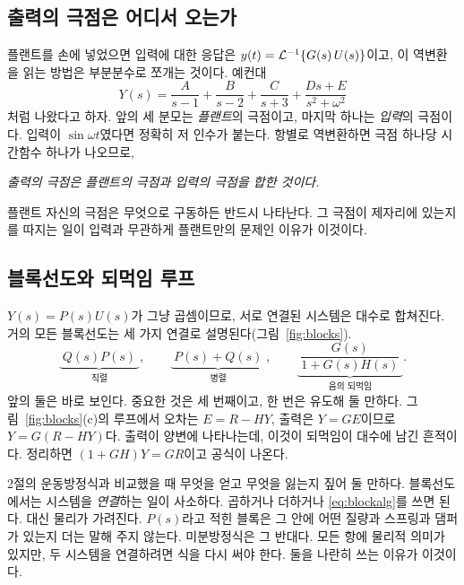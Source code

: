 \documentclass[11pt]{article}
\begin{document}
\subsection{출력의 극점은 어디서 오는가}\label{sec:outputpoles}
플랜트를 손에 넣었으면 입력에 대한 응답은 $y(t) = \mathcal{L}^{-1}\{G(s)\,U(s)\}$이고,
이 역변환을 읽는 방법은 부분분수로 쪼개는 것이다. 예컨대
\begin{equation}\label{eq:pfe}
   Y(s) = \frac{A}{s-1} + \frac{B}{s-2} + \frac{C}{s+3}
        + \frac{Ds+E}{s^{2}+\omega^{2}}
\end{equation}
처럼 나왔다고 하자. 앞의 세 분모는 \emph{플랜트}의 극점이고, 마지막 하나는
\emph{입력}의 극점이다. 입력이 $\sin\omega t$였다면 정확히 저 인수가 붙는다. 항별로
역변환하면 극점 하나당 시간함수 하나가 나오므로,
\begin{center}
\emph{출력의 극점은 플랜트의 극점과 입력의 극점을 합한 것이다.}
\end{center}
플랜트 자신의 극점은 무엇으로 구동하든 반드시 나타난다. 그 극점이 제자리에
있는지를 따지는 일이 입력과 무관하게 플랜트만의 문제인 이유가 이것이다.

\subsection{블록선도와 되먹임 루프}\label{sec:blocks}
$Y(s)=P(s)U(s)$가 그냥 곱셈이므로, 서로 연결된 시스템은 대수로 합쳐진다. 거의
모든 블록선도는 세 가지 연결로 설명된다(그림~\ref{fig:blocks}).
\begin{equation}\label{eq:blockalg}
   \underbrace{\;Q(s)P(s)\;}_{\text{직렬}},
   \qquad
   \underbrace{\;P(s)+Q(s)\;}_{\text{병렬}},
   \qquad
   \underbrace{\;\frac{G(s)}{1+G(s)H(s)}\;}_{\text{음의 되먹임}} .
\end{equation}
앞의 둘은 바로 보인다. 중요한 것은 세 번째이고, 한 번은 유도해 둘 만하다.
그림~\ref{fig:blocks}(c)의 루프에서 오차는 $E=R-HY$, 출력은 $Y=GE$이므로
$Y=G(R-HY)$다. 출력이 양변에 나타나는데, 이것이 되먹임이 대수에 남긴 흔적이다.
정리하면 $(1+GH)Y=GR$이고 공식이 나온다.

2절의 운동방정식과 비교했을 때 무엇을 얻고 무엇을 잃는지 짚어 둘 만하다.
블록선도에서는 시스템을 \emph{연결}하는 일이 사소하다. 곱하거나 더하거나
\eqref{eq:blockalg}를 쓰면 된다. 대신 물리가 가려진다. $P(s)$라고 적힌 블록은
그 안에 어떤 질량과 스프링과 댐퍼가 있는지 더는 말해 주지 않는다. 미분방정식은
그 반대다. 모든 항에 물리적 의미가 있지만, 두 시스템을 연결하려면 식을 다시
써야 한다. 둘을 나란히 쓰는 이유가 이것이다.
\end{document}

